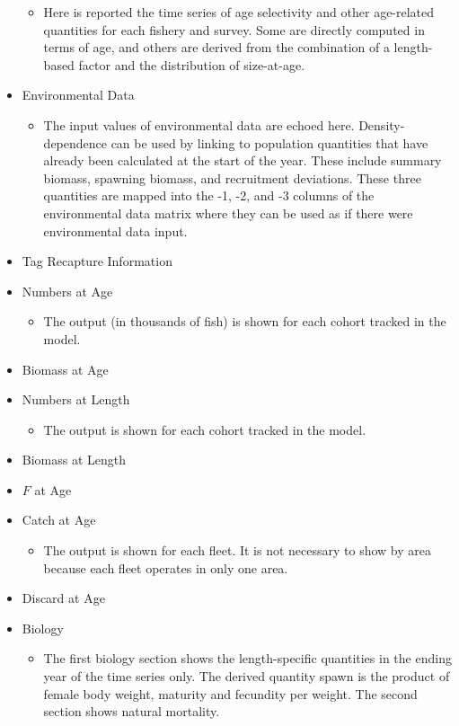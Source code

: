 \begin{itemize}
\begin{itemize}
		\item Here is reported the time series of age selectivity and other age-related quantities for each fishery and survey. Some are directly computed in terms of age, and others are derived from the combination of a length-based factor and the distribution of size-at-age.
	\end{itemize}
	\item Environmental Data
	\begin{itemize}
		\item The input values of environmental data are echoed here. Density-dependence can be used by linking to population quantities that have already been calculated at the start of the year. These include summary biomass, spawning biomass, and recruitment deviations. These three quantities are mapped into the -1, -2, and -3 columns of the environmental data matrix where they can be used as if there were environmental data input. 
	\end{itemize}
	\item Tag Recapture Information
	\item Numbers at Age
	\begin{itemize}
		\item The output (in thousands of fish) is shown for each cohort tracked in the model.
	\end{itemize}
	\item Biomass at Age
	\item Numbers at Length
	\begin{itemize}
		\item The output is shown for each cohort tracked in the model.
	\end{itemize}
	\item Biomass at Length
	\item $F$ at Age
	\item Catch at Age
	\begin{itemize}
		\item The output is shown for each fleet. It is not necessary to show by area because each fleet operates in only one area.
	\end{itemize}
	\item Discard at Age
	\item Biology
	\begin{itemize}
		\item The first biology section shows the length-specific quantities in the ending year of the time series only. The derived quantity spawn is the product of female body weight, maturity and fecundity per weight. The second section shows natural mortality.

\end{itemize}
\end{itemize}
